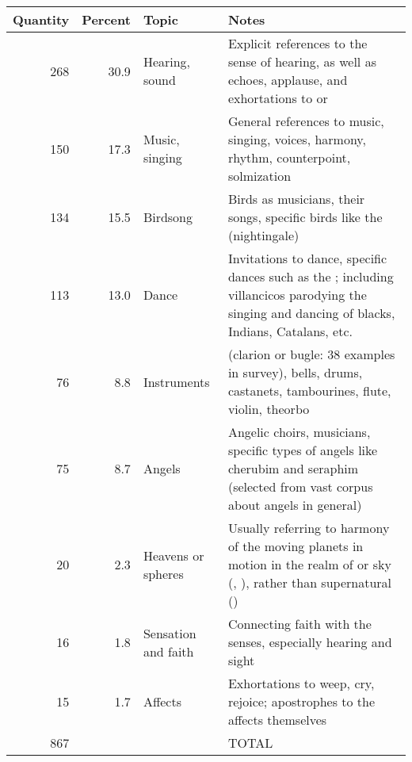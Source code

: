 \documentclass{tex/vcbook-float}
\begin{document}
\begin{tabulary}{\textwidth}{rrlL}
    \toprule
    Quantity
    & Percent 
    & Topic  
    & Notes \\
    \midrule

    268 
    & 30.9 
    & Hearing, sound   
    & Explicit references to the sense of hearing, as well as echoes, applause,
    and exhortations to   or  \\
    \addlinespace
    
    150 
    & 17.3 
    & Music, singing  
    & General references to music, singing, voices, harmony, rhythm,
    counterpoint, solmization \\
    \addlinespace
    
    134 
    & 15.5 
    & Birdsong    
    & Birds as musicians, their songs, specific birds like the 
    (nightingale) \\
    \addlinespace

    113 
    & 13.0 
    & Dance     
    & Invitations to dance, specific dances such as the 
    ; including  villancicos parodying the singing
    and dancing of blacks, Indians,  Catalans, etc. \\
    \addlinespace
    
    76 
    & 8.8 
    & Instruments   
    &  (clarion or bugle: 38 examples in survey), 
    bells, drums, castanets, tambourines, flute, violin, theorbo \\
    \addlinespace
    
    75 
    & 8.7 
    & Angels    
    & Angelic choirs, musicians, specific types of angels like cherubim and
    seraphim (selected from vast corpus about angels in general) \\
    \addlinespace
    
    20 
    & 2.3 
    & Heavens or spheres 
    & Usually referring to harmony of the moving planets in motion in the
    realm of  or sky (, ), rather
    than supernatural  () \\
    \addlinespace
    
    16 
    & 1.8 
    & Sensation and faith 
    & Connecting faith with the senses, especially hearing and sight \\
    \addlinespace
    
    15 
    & 1.7 
    & Affects    
    & Exhortations to weep, cry, rejoice; apostrophes to the affects
    themselves \\
    \midrule
   
    867 
    &  
    &       
    & TOTAL \\
    \bottomrule
\end{tabulary} 
\end{document}
